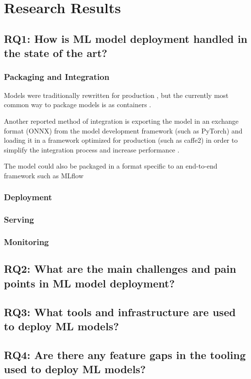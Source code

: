 \chapter{Research Results}
\section{RQ1: How is ML model deployment handled in the state of the art?}
\subsection{Packaging and Integration}
Models were traditionally rewritten for production \cite{Hazelwood2018}, but the currently most common way to package models is as containers  \cite{Garcia2020, Li2017, Ruf2021, Crankshaw2017}.

Another reported method of integration is exporting the model in an exchange format (ONNX) from the model development framework (such as PyTorch) and loading it in a framework optimized for production (such as caffe2) in order to simplify the integration process and increase performance \cite{Hazelwood2018}.

The model could also be packaged in a format specific to an end-to-end framework such as MLflow \cite{Chen2020a}

\subsection{Deployment}
\subsection{Serving}
\subsection{Monitoring}
\section{RQ2: What are the main challenges and pain points in ML model deployment?}
\section{RQ3: What tools and infrastructure are used to deploy ML models?}
\section{RQ4: Are there any feature gaps in the tooling used to deploy ML models?}